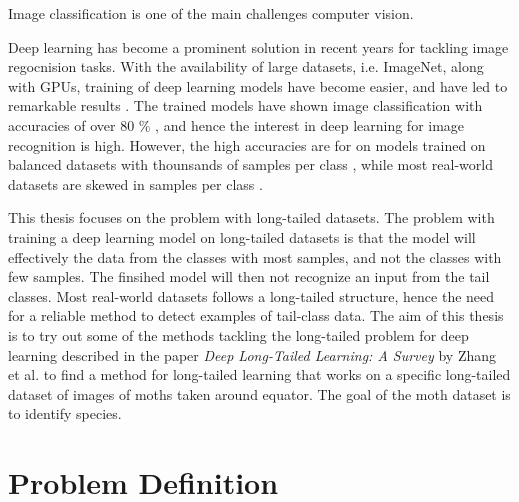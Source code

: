 

\label{sec:introduction}


Image classification is one of the main challenges computer vision.

Deep learning has become a prominent solution in recent years for tackling image regocnision tasks. With the availability of large datasets, i.e. ImageNet, along with GPUs, training of deep learning models have become easier, and have led to remarkable results . The trained models have shown image classification with accuracies of over 80 \% , and hence the interest in deep learning for image recognition is high. However, the high accuracies are for on models trained on balanced datasets with thounsands of samples per class , while most real-world datasets are skewed in samples per class .  


This thesis focuses on the problem with long-tailed datasets. The problem with training a deep learning model on long-tailed datasets is that the model will effectively the data from the classes with most samples, and not the classes with few samples. The finsihed model will then not recognize an input from the tail classes. Most real-world datasets follows a long-tailed structure, hence the need for a reliable method to detect examples of tail-class data. The aim of this thesis is to try out some of the methods tackling the long-tailed problem for deep learning described in the paper \textit{Deep Long-Tailed Learning: A Survey} by Zhang et al.\cite{zhang2023deep} to find a method for long-tailed learning that works on a specific long-tailed dataset of images of moths taken around equator. The goal of the moth dataset is to identify species.

\section{Problem Definition}

